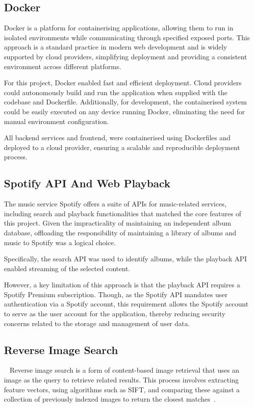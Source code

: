 \subsection{Docker}
Docker is a platform for containerising applications, allowing them to run in isolated environments while communicating through specified exposed ports. This approach is a standard practice in modern web development and is widely supported by cloud providers, simplifying deployment and providing a consistent environment across different platforms.

For this project, Docker enabled fast and efficient deployment. Cloud providers could autonomously build and run the application when supplied with the codebase and Dockerfile. Additionally, for development, the containerised system could be easily executed on any device running Docker, eliminating the need for manual environment configuration.

All backend services and frontend, were containerised using Dockerfiles and deployed to a cloud provider, ensuring a scalable and reproducible deployment process.

\subsection{Spotify API And Web Playback}
The music service Spotify offers a suite of APIs for music-related services, including search and playback functionalities that matched the core features of this project. Given the impracticality of maintaining an independent album database, offloading the responsibility of maintaining a library of albums and music to Spotify was a logical choice.

Specifically, the search API was used to identify albums, while the playback API enabled streaming of the selected content.

However, a key limitation of this approach is that the playback API requires a Spotify Premium subscription. Though, as the Spotify API mandates user authentication via a Spotify account, this requirement allows the Spotify account to serve as the user account for the application, thereby reducing security concerns related to the storage and management of user data.

\subsection{Reverse Image Search}~\label{sec:reverse-image-search}
Reverse image search is a form of content-based image retrieval that uses an image as the query to retrieve related results. This process involves extracting feature vectors, using algorithms such as SIFT, and comparing these against a collection of previously indexed images to return the closest matches~\cite{Gaillard2017LargeSR}.

